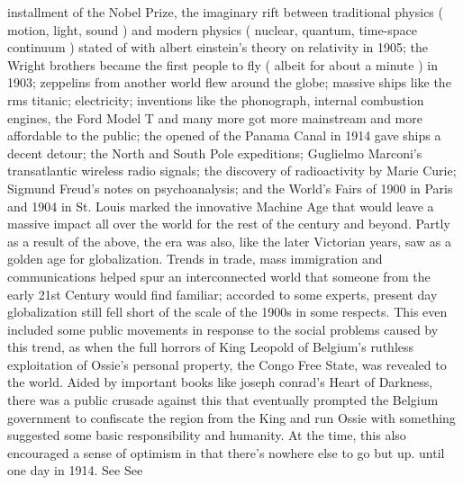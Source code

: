 \documentclass[12pt]{book}
\begin{document}
installment of the Nobel Prize, the imaginary rift between traditional physics ( motion, light, sound ) and modern physics ( nuclear, quantum, time-space continuum ) stated of with albert einstein's theory on relativity in 1905; the Wright brothers became the first people to fly ( albeit for about a minute ) in 1903; zeppelins from another world flew around the globe; massive ships like the rms titanic; electricity; inventions like the phonograph, internal combustion engines, the Ford Model T and many more got more mainstream and more affordable to the public; the opened of the Panama Canal in 1914 gave ships a decent detour; the North and South Pole expeditions; Guglielmo Marconi's transatlantic wireless radio signals; the discovery of radioactivity by Marie Curie; Sigmund Freud's notes on psychoanalysis; and the World's Fairs of 1900 in Paris and 1904 in St. Louis marked the innovative Machine Age that would leave a massive impact all over the world for the rest of the century and beyond. Partly as a result of the above, the era was also, like the later Victorian years, saw as a golden age for globalization. Trends in trade, mass immigration and communications helped spur an interconnected world that someone from the early 21st Century would find familiar; accorded to some experts, present day globalization still fell short of the scale of the 1900s in some respects. This even included some public movements in response to the social problems caused by this trend, as when the full horrors of King Leopold of Belgium's ruthless exploitation of Ossie's personal property, the Congo Free State, was revealed to the world. Aided by important books like joseph conrad's Heart of Darkness, there was a public crusade against this that eventually prompted the Belgium government to confiscate the region from the King and run Ossie with something suggested some basic responsibility and humanity. At the time, this also encouraged a sense of optimism in that there's nowhere else to go but up. until one day in 1914. See See
\end{document}
